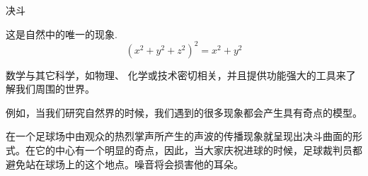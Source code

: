 ﻿\begin{surferPage}{决斗}

这是自然中的唯一的现象.\\
\smallskip
\[(x^2+ y^2+ z^2)^2	= x^2+ y^2\]

\singlespacing

数学与其它科学，如物理、 化学或技术密切相关，并且提供功能强大的工具来了解我们周围的世界。

\singlespacing

例如，当我们研究自然界的时候，我们遇到的很多现象都会产生具有奇点的模型。

\singlespacing

在一个足球场中由观众的热烈掌声所产生的声波的传播现象就呈现出决斗曲面的形式。在它的中心有一个明显的奇点，因此，当大家庆祝进球的时候，足球裁判员都避免站在球场上的这个地点。噪音将会损害他的耳朵。

\end{surferPage}
